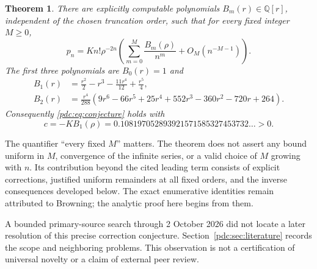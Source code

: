 \documentclass[11pt,letterpaper]{article}
\newtheorem{theorem}{Theorem}[section]
\theoremstyle{remark}\newtheorem{remark}[theorem]{Remark}
\newcommand{\Q}{\mathbb Q}
\begin{document}
\begin{theorem}\label{pdc:thm:main}
There are explicitly computable polynomials $B_m(r)\in\Q[r]$, independent of the chosen truncation order, such that for every fixed integer $M\geq0$,
\begin{equation}\label{pdc:eq:main}
 p_n=K n!\rho^{-2n}\left(\sum_{m=0}^M\frac{B_m(\rho)}{n^m}
              +O_M(n^{-M-1})\right).
\end{equation}
The first three polynomials are $B_0(r)=1$ and
\begin{align}
 B_1(r)&=\frac{r^2}{2}-r^3-\frac{11r^4}{12}+\frac{r^5}{4},\label{pdc:eq:B1}\\
 B_2(r)&=\frac{r^4}{288}\left(9r^6-66r^5+25r^4+552r^3
                    -360r^2-720r+264\right).\label{pdc:eq:B2}
\end{align}
Consequently \eqref{pdc:eq:conjecture} holds with
\begin{equation}\label{pdc:eq:c}
 c=-K B_1(\rho)=0.108197052893921571585327453732\ldots>0.
\end{equation}
\end{theorem}

The quantifier ``every fixed $M$'' matters. The theorem does not assert any bound uniform in $M$, convergence of the infinite series, or a valid choice of $M$ growing with $n$. Its contribution beyond the cited leading term consists of explicit corrections, justified uniform remainders at all fixed orders, and the inverse consequences developed below. The exact enumerative identities remain attributed to Browning; the analytic proof here begins from them.

A bounded primary-source search through 2 October 2026 did not locate a later resolution of this precise correction conjecture. Section~\ref{pdc:sec:literature} records the scope and neighboring problems. This observation is not a certification of universal novelty or a claim of external peer review.
\end{document}
